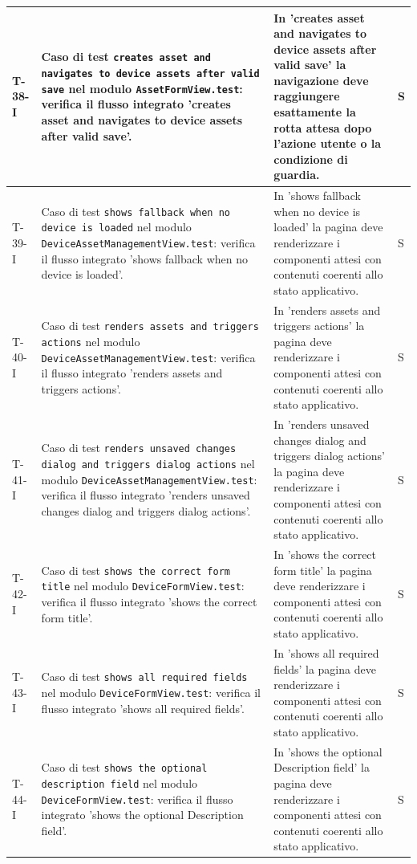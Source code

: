 \documentclass[a4paper,12pt]{article}
\begin{document}
{{\begin{longtable}{|>{\RaggedRight\arraybackslash}p{1.55cm}|>{\RaggedRight\arraybackslash}p{8.0cm}|>{\RaggedRight\arraybackslash}p{4.6cm}|>{\RaggedRight\arraybackslash}p{1.2cm}|}
        \hline
        T-38-I & Caso di test \texttt{creates asset and navigates to device assets after valid save} nel modulo \texttt{AssetFormView.test}: verifica il flusso integrato 'creates asset and navigates to device assets after valid save'. & In 'creates asset and navigates to device assets after valid save' la navigazione deve raggiungere esattamente la rotta attesa dopo l'azione utente o la condizione di guardia. & S \\
        \hline
        T-39-I & Caso di test \texttt{shows fallback when no device is loaded} nel modulo \texttt{DeviceAssetManagementView.test}: verifica il flusso integrato 'shows fallback when no device is loaded'. & In 'shows fallback when no device is loaded' la pagina deve renderizzare i componenti attesi con contenuti coerenti allo stato applicativo. & S \\
        \hline
        T-40-I & Caso di test \texttt{renders assets and triggers actions} nel modulo \texttt{DeviceAssetManagementView.test}: verifica il flusso integrato 'renders assets and triggers actions'. & In 'renders assets and triggers actions' la pagina deve renderizzare i componenti attesi con contenuti coerenti allo stato applicativo. & S \\
        \hline
        T-41-I & Caso di test \texttt{renders unsaved changes dialog and triggers dialog actions} nel modulo \texttt{DeviceAssetManagementView.test}: verifica il flusso integrato 'renders unsaved changes dialog and triggers dialog actions'. & In 'renders unsaved changes dialog and triggers dialog actions' la pagina deve renderizzare i componenti attesi con contenuti coerenti allo stato applicativo. & S \\
        \hline
        T-42-I & Caso di test \texttt{shows the correct form title} nel modulo \texttt{DeviceFormView.test}: verifica il flusso integrato 'shows the correct form title'. & In 'shows the correct form title' la pagina deve renderizzare i componenti attesi con contenuti coerenti allo stato applicativo. & S \\
        \hline
        T-43-I & Caso di test \texttt{shows all required fields} nel modulo \texttt{DeviceFormView.test}: verifica il flusso integrato 'shows all required fields'. & In 'shows all required fields' la pagina deve renderizzare i componenti attesi con contenuti coerenti allo stato applicativo. & S \\
        \hline
        T-44-I & Caso di test \texttt{shows the optional description field} nel modulo \texttt{DeviceFormView.test}: verifica il flusso integrato 'shows the optional Description field'. & In 'shows the optional Description field' la pagina deve renderizzare i componenti attesi con contenuti coerenti allo stato applicativo. & S \\

\end{longtable}}}
\end{document}
